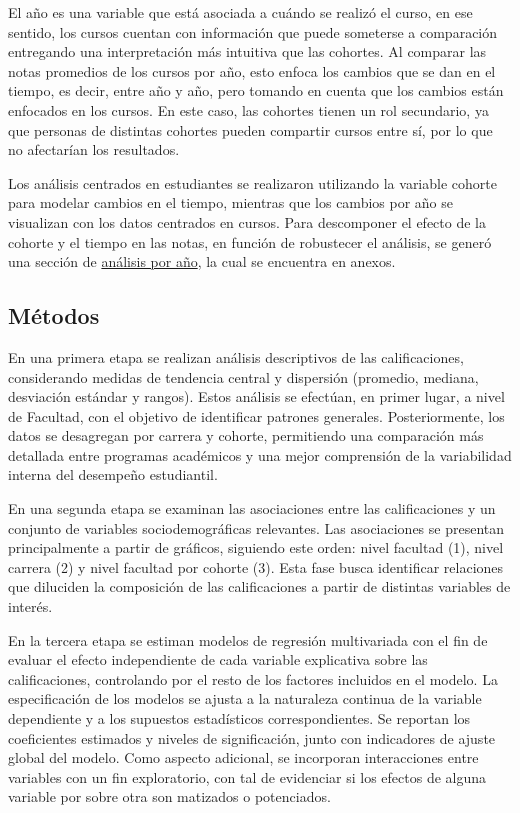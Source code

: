 \documentclass[
  spanish,
  a4paper,
  oneside]{scrbook}
\begin{document}
El año es una variable que está asociada a cuándo se realizó el curso,
en ese sentido, los cursos cuentan con información que puede someterse a
comparación entregando una interpretación más intuitiva que las
cohortes. Al comparar las notas promedios de los cursos por año, esto
enfoca los cambios que se dan en el tiempo, es decir, entre año y año,
pero tomando en cuenta que los cambios están enfocados en los cursos. En
este caso, las cohortes tienen un rol secundario, ya que personas de
distintas cohortes pueden compartir cursos entre sí, por lo que no
afectarían los resultados.

Los análisis centrados en estudiantes se realizaron utilizando la
variable cohorte para modelar cambios en el tiempo, mientras que los
cambios por año se visualizan con los datos centrados en cursos. Para
descomponer el efecto de la cohorte y el tiempo en las notas, en función
de robustecer el análisis, se generó una sección de
\href{https://tomasurzuam.github.io/estudio-notas/docs/apendices/A-analisis-tiempo.html}{análisis
por año}, la cual se encuentra en anexos.

\subsection{Métodos}\label{muxe9todos}

En una primera etapa se realizan análisis descriptivos de las
calificaciones, considerando medidas de tendencia central y dispersión
(promedio, mediana, desviación estándar y rangos). Estos análisis se
efectúan, en primer lugar, a nivel de Facultad, con el objetivo de
identificar patrones generales. Posteriormente, los datos se desagregan
por carrera y cohorte, permitiendo una comparación más detallada entre
programas académicos y una mejor comprensión de la variabilidad interna
del desempeño estudiantil.

En una segunda etapa se examinan las asociaciones entre las
calificaciones y un conjunto de variables sociodemográficas relevantes.
Las asociaciones se presentan principalmente a partir de gráficos,
siguiendo este orden: nivel facultad (1), nivel carrera (2) y nivel
facultad por cohorte (3). Esta fase busca identificar relaciones que
diluciden la composición de las calificaciones a partir de distintas
variables de interés.

En la tercera etapa se estiman modelos de regresión multivariada con el
fin de evaluar el efecto independiente de cada variable explicativa
sobre las calificaciones, controlando por el resto de los factores
incluidos en el modelo. La especificación de los modelos se ajusta a la
naturaleza continua de la variable dependiente y a los supuestos
estadísticos correspondientes. Se reportan los coeficientes estimados y
niveles de significación, junto con indicadores de ajuste global del
modelo. Como aspecto adicional, se incorporan interacciones entre
variables con un fin exploratorio, con tal de evidenciar si los efectos
de alguna variable por sobre otra son matizados o potenciados.
\end{document}
